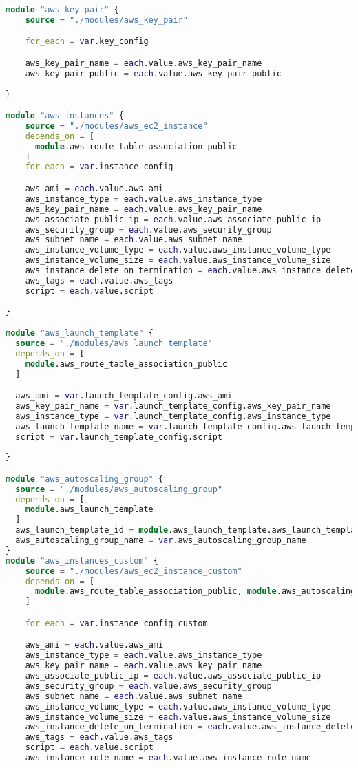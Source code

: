 \begin{lstlisting}[language=terraform]
  module "aws_key_pair" {
    source = "./modules/aws_key_pair"

    for_each = var.key_config

    aws_key_pair_name = each.value.aws_key_pair_name
    aws_key_pair_public = each.value.aws_key_pair_public
  
}

module "aws_instances" {
    source = "./modules/aws_ec2_instance"
    depends_on = [
      module.aws_route_table_association_public
    ]
    for_each = var.instance_config

    aws_ami = each.value.aws_ami
    aws_instance_type = each.value.aws_instance_type
    aws_key_pair_name = each.value.aws_key_pair_name
    aws_associate_public_ip = each.value.aws_associate_public_ip
    aws_security_group = each.value.aws_security_group
    aws_subnet_name = each.value.aws_subnet_name
    aws_instance_volume_type = each.value.aws_instance_volume_type
    aws_instance_volume_size = each.value.aws_instance_volume_size
    aws_instance_delete_on_termination = each.value.aws_instance_delete_on_termination
    aws_tags = each.value.aws_tags
    script = each.value.script
  
}

module "aws_launch_template" {
  source = "./modules/aws_launch_template"
  depends_on = [
    module.aws_route_table_association_public
  ]

  aws_ami = var.launch_template_config.aws_ami
  aws_key_pair_name = var.launch_template_config.aws_key_pair_name
  aws_instance_type = var.launch_template_config.aws_instance_type
  aws_launch_template_name = var.launch_template_config.aws_launch_template_name
  script = var.launch_template_config.script
  
}

module "aws_autoscaling_group" {
  source = "./modules/aws_autoscaling_group"
  depends_on = [
    module.aws_launch_template
  ]
  aws_launch_template_id = module.aws_launch_template.aws_launch_template_id
  aws_autoscaling_group_name = var.aws_autoscaling_group_name
}
module "aws_instances_custom" {
    source = "./modules/aws_ec2_instance_custom"
    depends_on = [
      module.aws_route_table_association_public, module.aws_autoscaling_group
    ]

    for_each = var.instance_config_custom

    aws_ami = each.value.aws_ami
    aws_instance_type = each.value.aws_instance_type
    aws_key_pair_name = each.value.aws_key_pair_name
    aws_associate_public_ip = each.value.aws_associate_public_ip
    aws_security_group = each.value.aws_security_group
    aws_subnet_name = each.value.aws_subnet_name
    aws_instance_volume_type = each.value.aws_instance_volume_type
    aws_instance_volume_size = each.value.aws_instance_volume_size
    aws_instance_delete_on_termination = each.value.aws_instance_delete_on_termination
    aws_tags = each.value.aws_tags
    script = each.value.script
    aws_instance_role_name = each.value.aws_instance_role_name
  

\end{lstlisting}
